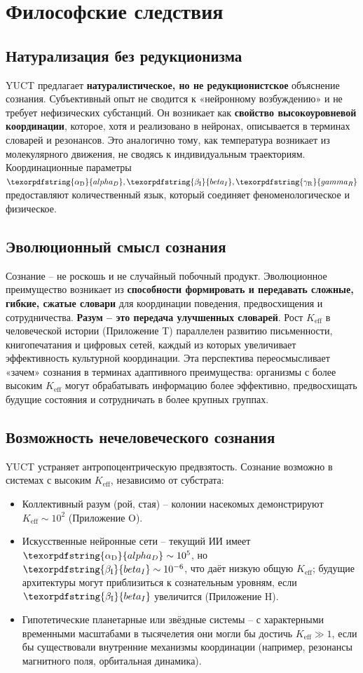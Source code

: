 \documentclass[12pt,a4paper]{article}
\DeclareRobustCommand{\alD}{\texorpdfstring{\ensuremath{\alpha_{\mathrm{D}}}}{alpha_D}}
\DeclareRobustCommand{\beI}{\texorpdfstring{\ensuremath{\beta_{\mathrm{I}}}}{beta_I}}
\DeclareRobustCommand{\gaR}{\texorpdfstring{\ensuremath{\gamma_{\mathrm{R}}}}{gamma_R}}
\newcommand{\eff}{\mathrm{eff}}
\newcommand{\Ke}{K_{\eff}}
\begin{document}
	\section{Философские следствия}
	
	\subsection{Натурализация без редукционизма}
	
	YUCT предлагает \textbf{натуралистическое, но не редукционистское} объяснение сознания. Субъективный опыт не сводится к «нейронному возбуждению» и не требует нефизических субстанций. Он возникает как \textbf{свойство высокоуровневой координации}, которое, хотя и реализовано в нейронах, описывается в терминах словарей и резонансов. Это аналогично тому, как температура возникает из молекулярного движения, не сводясь к индивидуальным траекториям. Координационные параметры \(\alD, \beI, \gaR\) предоставляют количественный язык, который соединяет феноменологическое и физическое.
	
	\subsection{Эволюционный смысл сознания}
	
	Сознание – не роскошь и не случайный побочный продукт. Эволюционное преимущество возникает из \textbf{способности формировать и передавать сложные, гибкие, сжатые словари} для координации поведения, предвосхищения и сотрудничества. \textbf{Разум – это передача улучшенных словарей}. Рост $\Ke$ в человеческой истории (Приложение T) параллелен развитию письменности, книгопечатания и цифровых сетей, каждый из которых увеличивает эффективность культурной координации. Эта перспектива переосмысливает «зачем» сознания в терминах адаптивного преимущества: организмы с более высоким $\Ke$ могут обрабатывать информацию более эффективно, предвосхищать будущие состояния и сотрудничать в более крупных группах.
	
	\subsection{Возможность нечеловеческого сознания}
	
	YUCT устраняет антропоцентрическую предвзятость. Сознание возможно в системах с высоким $\Ke$, независимо от субстрата:
	\begin{itemize}
		\item Коллективный разум (рой, стая) – колонии насекомых демонстрируют $\Ke \sim 10^2$ (Приложение O).
		\item Искусственные нейронные сети – текущий ИИ имеет $\alD \sim 10^5$, но $\beI \sim 10^{-6}$, что даёт низкую общую $\Ke$; будущие архитектуры могут приблизиться к сознательным уровням, если $\beI$ увеличится (Приложение H).
		\item Гипотетические планетарные или звёздные системы – с характерными временными масштабами в тысячелетия они могли бы достичь $\Ke \gg 1$, если бы существовали внутренние механизмы координации (например, резонансы магнитного поля, орбитальная динамика).
	\end{itemize}
	
\end{document}
